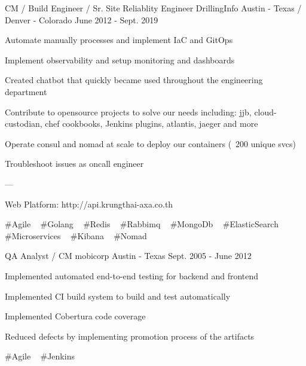 \begin{cventries}
  \cventry
    {CM / Build Engineer / Sr. Site Reliablity Engineer} %
    {DrillingInfo} %
    {Austin - Texas / Denver - Colorado} %
    {June 2012 - Sept. 2019} %
    {
      \begin{cvitems} %
        \item {Automate manually processes and implement IaC and GitOps}
        \item {Implement observability and setup monitoring and dashboards}
        \item {Created chatbot that quickly became used throughout the engineering department}
        \item {Contribute to opensource projects to solve our needs including: jjb, cloud- custodian, chef cookbooks, Jenkins plugins, atlantis, jaeger and more}
        \item {Operate consul and nomad at scale to deploy our containers (~200 unique svcs)}
        \item {Troubleshoot issues as oncall engineer}
        \item {---}
        \item {Web Platform: http://api.krungthai-axa.co.th}
      \end{cvitems}
    }
    {
      \#Agile ~
      \#Golang ~
      \#Redis ~
      \#Rabbimq ~
      \#MongoDb ~
      \#ElasticSearch ~
      \#Microservices ~
      \#Kibana ~
      \#Nomad ~
    }

  \cventry
    {QA Analyst / CM} %
    {mobicorp} %
    {Austin - Texas} %
    {Sept. 2005 - June 2012} %
    {
      \begin{cvitems} %
        \item {Implemented automated end-to-end testing for backend and frontend}
        \item {Implemented CI build system to build and test automatically}
        \item {Implemented Cobertura code coverage}
        \item {Reduced defects by implementing promotion process of the artifacts}
      \end{cvitems}
    }
    {
      \#Agile ~
      \#Jenkins ~
    }

\end{cventries}
